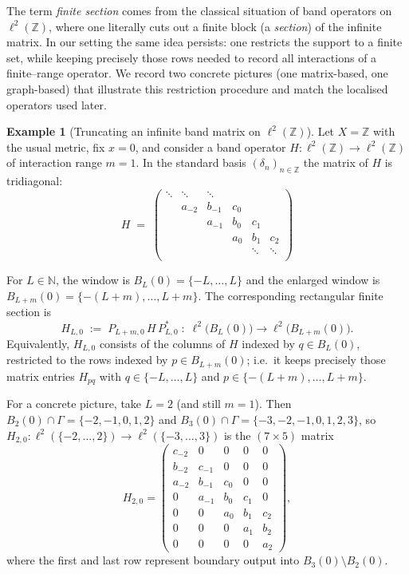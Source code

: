 \documentclass[11pt]{article}
\theoremstyle{definition}
\newtheorem{example}[theorem]{Example}
\begin{document}
The term \emph{finite section} comes from the classical situation of band
operators on $\ell^2(\mathbb{Z})$, where one literally cuts out a finite block (a
\emph{section}) of the infinite matrix.  In our setting the same idea persists:
one restricts the support to a finite set, while keeping precisely
those rows needed to record all interactions of a finite--range operator.
We record two concrete pictures (one matrix-based, one graph-based) that
illustrate this restriction procedure and match the localised operators used
later.

\begin{example}[Truncating an infinite band matrix on $\ell^2(\mathbb{Z})$]
Let $X=\mathbb{Z}$ with the usual metric, fix $x=0$, and consider a band operator
$H:\ell^2(\mathbb{Z})\to\ell^2(\mathbb{Z})$ of interaction range $m=1$.  In the standard basis
$(\delta_n)_{n\in\mathbb{Z}}$ the matrix of $H$ is tridiagonal:
\[
H \;=\;
\begin{pmatrix}
\ddots & \ddots & \ddots &        &        &        \\
       & a_{-2} & b_{-1} & c_{0}  &        &        \\
       &        & a_{-1} & b_{0}   & c_{1}  &        \\
       &        &        & a_{0}   & b_{1}  & c_{2}  \\
       &        &        &         & \ddots & \ddots \\
\end{pmatrix}
\]

\medskip
For $L\in\mathbb{N}$, the window is $B_{L}(0)=\{-L,\dots,L\}$ and the enlarged window is
$B_{L+m}(0)=\{-(L+m),\dots,L+m\}$.  The corresponding rectangular finite section
is
\[
  H_{L,0}
  \;:=\;
  P_{L+m,0}\,H\,P_{L,0}^*
  \;:\;
  \ell^2\!\bigl(B_L(0)\bigr)\longrightarrow \ell^2\!\bigl(B_{L+m}(0)\bigr).
\]
Equivalently, $H_{L,0}$ consists of the columns of $H$ indexed by
$q\in B_L(0)$, restricted to the rows indexed by $p\in B_{L+m}(0)$; i.e.\ it
keeps precisely those matrix entries $H_{pq}$ with
$q\in\{-L,\dots,L\}$ and $p\in\{-(L+m),\dots,L+m\}$.

\medskip
For a concrete picture, take $L=2$ (and still $m=1$). Then
$B_{2}(0)\cap\Gamma=\{-2,-1,0,1,2\}$ and $B_{3}(0)\cap\Gamma=\{-3,-2,-1,0,1,2,3\}$, so
$H_{2,0}:\ell^2(\{-2,\dots,2\})\to \ell^2(\{-3,\dots,3\})$ is the
$(7\times 5)$ matrix
\[
H_{2,0}=
\left(
\begin{array}{ccccc}
 c_{-2} & 0     & 0     & 0     & 0     \\
 b_{-2} & c_{-1}& 0     & 0     & 0     \\
 a_{-2} & b_{-1}& c_{0}& 0     & 0     \\
 0      & a_{-1}& b_{0} & c_{1} & 0     \\
 0      & 0     & a_{0} & b_{1} & c_{2} \\
 0      & 0     & 0     & a_{1} & b_{2} \\
 0      & 0     & 0     & 0     & a_{2}
\end{array}
\right),
\]
where the first and last row represent boundary output into
$B_{3}(0)\setminus B_{2}(0)$.
\end{example}
\end{document}
